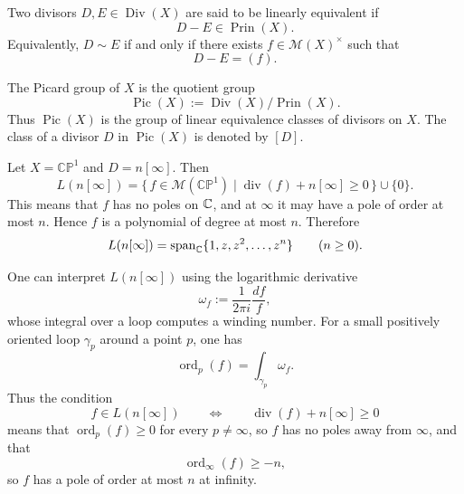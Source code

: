 \documentclass[11pt,openany]{article}
\newcommand{\CP}{\mathbb{CP}}
\newcommand{\MM}{\mathcal{M}}
\newcommand{\Div}{\operatorname{Div}}
\newcommand{\Pic}{\operatorname{Pic}}
\newcommand{\CPone}{\CP^1}
\newcommand{\Prin}{\operatorname{Prin}}
\begin{document}
\begin{definition}
	Two divisors \(D,E\in \Div(X)\) are said to be linearly equivalent if
	\[
	D-E\in \Prin(X).
	\]
	Equivalently, \(D\sim E\) if and only if there exists \(f\in \mathcal M(X)^\times\) such
	that
	\[
	D-E=(f).
	\]
\end{definition}

\begin{definition}
	The Picard group of \(X\) is the quotient group
	\[
	\Pic(X):=\Div(X)/\Prin(X).
	\]
	Thus \(\Pic(X)\) is the group of linear equivalence classes of divisors on \(X\).
	The class of a divisor \(D\) in \(\Pic(X)\) is denoted by \([D]\).
\end{definition}

\begin{example}
	Let \(X=\CP^1\) and \(D=n[\infty]\). Then
	\[
	L(n[\infty])
	=
	\{\,f\in \mathcal M(\CP^1)\mid \operatorname{div}(f)+n[\infty]\ge 0\,\}\cup\{0\}.
	\]
	This means that \(f\) has no poles on \(\mathbb{C}\), and at \(\infty\) it may have a pole of
	order at most \(n\). Hence \(f\) is a polynomial of degree at most \(n\). Therefore
	\[
	L(n[\infty])=\operatorname{span}_{\mathbb{C}}\{1,z,z^2,\dots,z^n\}
	\qquad (n\ge 0).
	\]
\end{example}

\newpage
%
%
%
%


One can interpret $L(n[\infty])$ using the logarithmic derivative
\[
\omega_f:=\frac{1}{2\pi i}\frac{df}{f},
\]
whose integral over a loop computes a winding number. For a small positively oriented loop $\gamma_p$ around a point $p$, one has
\[
\operatorname{ord}_p(f)=\int_{\gamma_p}\omega_f.
\]
Thus the condition
\[
f\in L(n[\infty])
\qquad\Longleftrightarrow\qquad
\operatorname{div}(f)+n[\infty]\ge 0
\]
means that $\operatorname{ord}_p(f)\ge 0$ for every $p\neq \infty$, so $f$ has no poles away from $\infty$, and that
\[
\operatorname{ord}_\infty(f)\ge -n,
\]
so $f$ has a pole of order at most $n$ at infinity.
\end{document}
